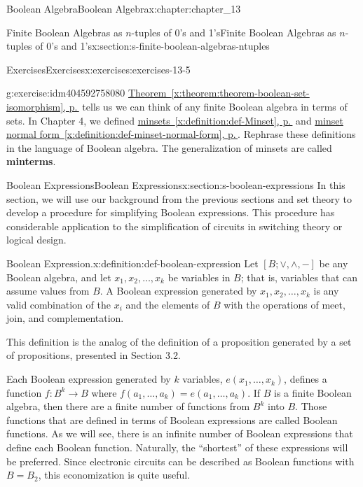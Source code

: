\documentclass[twoside,10pt,]{book}
\newcommand{\xreffont}{\relax}
\newcommand{\terminology}[1]{\textbf{#1}}
\numberwithin{equation}{section}
\begin{document}
\begin{chapterptx}{Boolean Algebra}{}{Boolean Algebra}{}{}{x:chapter:chapter_13}
\begin{sectionptx}{Finite Boolean Algebras as \(n\)-tuples of 0's and 1's}{}{Finite Boolean Algebras as \(n\)-tuples of 0's and 1's}{}{}{x:section:s-finite-boolean-algebras-ntuples}
\begin{exercises-subsection}{Exercises}{}{Exercises}{}{}{x:exercises:exercises-13-5}
\begin{divisionexercise}{4}{}{}{g:exercise:idm404592758080}
\hyperref[x:theorem:theorem-boolean-set-isomorphism]{Theorem~{\xreffont\ref{x:theorem:theorem-boolean-set-isomorphism}}, p.\,\pageref{x:theorem:theorem-boolean-set-isomorphism}} tells us we can think of any finite Boolean algebra in terms of sets. In Chapter 4,  we defined  \hyperref[x:definition:def-Minset]{minsets~{\xreffont\ref{x:definition:def-Minset}}, p.\,\pageref{x:definition:def-Minset}} and \hyperref[x:definition:def-minset-normal-form]{minset normal form~{\xreffont\ref{x:definition:def-minset-normal-form}}, p.\,\pageref{x:definition:def-minset-normal-form}}.  Rephrase these definitions in the language of Boolean algebra. The generalization of minsets are called \terminology{minterms}.%
\end{divisionexercise}%
\end{exercises-subsection}
\end{sectionptx}
%
%
\typeout{************************************************}
\typeout{************************************************}
%
\begin{sectionptx}{Boolean Expressions}{}{Boolean Expressions}{}{}{x:section:s-boolean-expressions}
%
In this section, we will use our background from the previous sections and set theory to develop a procedure for simplifying Boolean expressions. This procedure has considerable application to the simplification of circuits in switching theory or logical design.%
\begin{definition}{Boolean Expression.}{x:definition:def-boolean-expression}%
%
Let  \([B; \lor , \land, - ]\) be any Boolean algebra, and let \(x_1, x_2,
\ldots , x_k\) be variables in \(B\); that is, variables that can assume values from \(B\). A Boolean expression generated by  \(x_1, x_2, \ldots , x_k\) is any valid combination of the \(x_i\) and the elements of \(B\) with the operations of meet, join, and complementation.%
\end{definition}
This definition is the analog of the definition of a proposition generated by a set of propositions, presented in Section 3.2.%
\par
Each Boolean expression generated by \(k\) variables, \(e\left(x_1, \ldots , x_k\right)\), defines a function \(f: B^k \to B\) where \(f\left(a_1,\ldots , a_k\right)=e\left(a_1, \ldots , a_k\right)\). If \(B\) is a finite Boolean algebra, then there are a finite number of functions from \(B^k\) into \(B\). Those functions that are defined in terms of Boolean expressions are called Boolean functions.  As we will see, there is an infinite number of Boolean expressions that define each Boolean function. Naturally, the ``shortest'' of these expressions will be preferred. Since electronic circuits can be described as Boolean functions with \(B=B_2\), this economization is quite useful.%

\end{sectionptx}
\end{chapterptx}
\end{document}
